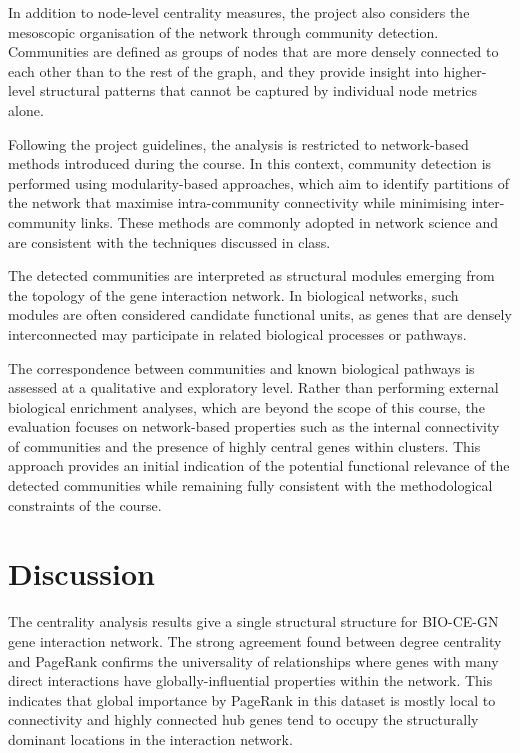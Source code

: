 In addition to node-level centrality measures, the project also considers the mesoscopic organisation of the network through community detection. Communities are defined as groups of nodes that are more densely connected to each other than to the rest of the graph, and they provide insight into higher-level structural patterns that cannot be captured by individual node metrics alone.

Following the project guidelines, the analysis is restricted to network-based methods introduced during the course. In this context, community detection is performed using modularity-based approaches, which aim to identify partitions of the network that maximise intra-community connectivity while minimising inter-community links. These methods are commonly adopted in network science and are consistent with the techniques discussed in class.

The detected communities are interpreted as structural modules emerging from the topology of the gene interaction network. In biological networks, such modules are often considered candidate functional units, as genes that are densely interconnected may participate in related biological processes or pathways.

The correspondence between communities and known biological pathways is assessed at a qualitative and exploratory level. Rather than performing external biological enrichment analyses, which are beyond the scope of this course, the evaluation focuses on network-based properties such as the internal connectivity of communities and the presence of highly central genes within clusters. This approach provides an initial indication of the potential functional relevance of the detected communities while remaining fully consistent with the methodological constraints of the course.


\section{Discussion}

The centrality analysis results give a single structural structure for BIO-CE-GN gene interaction network. The strong agreement found between degree centrality and PageRank confirms the universality of relationships where genes with many direct interactions have globally-influential properties within the network. This indicates that global importance by PageRank in this dataset is mostly local to connectivity and highly connected hub genes tend to occupy the structurally dominant locations in the interaction network.

